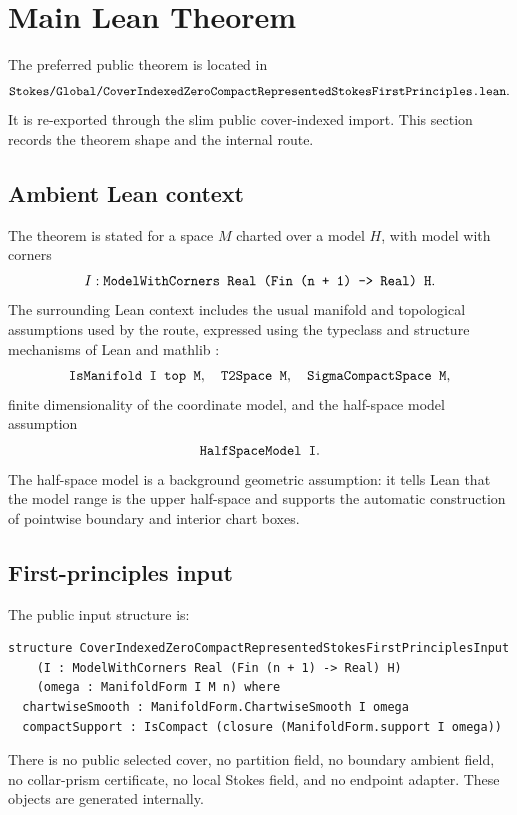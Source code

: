 \section{Main Lean Theorem}
\label{sec:main-theorem}

The preferred public theorem is located in
\[
\code{Stokes/Global/CoverIndexedZeroCompactRepresentedStokesFirstPrinciples.lean}.
\]
It is re-exported through the slim public cover-indexed import.  This section
records the theorem shape and the internal route.

\subsection{Ambient Lean context}

The theorem is stated for a space \(M\) charted over a model \(H\), with model
with corners
\[
  I : \code{ModelWithCorners Real (Fin (n + 1) -> Real) H}.
\]
The surrounding Lean context includes the usual manifold and topological
assumptions used by the route, expressed using the typeclass and structure
mechanisms of Lean and mathlib
\cite{demoura2015lean,demoura2021lean4,baanen2022instance,mathlib2020}:
\[
\code{IsManifold I top M},\quad
\code{T2Space M},\quad
\code{SigmaCompactSpace M},
\]
finite dimensionality of the coordinate model, and the half-space model
assumption
\[
\code{HalfSpaceModel I}.
\]
The half-space model is a background geometric assumption: it tells Lean that
the model range is the upper half-space and supports the automatic construction
of pointwise boundary and interior chart boxes.

\subsection{First-principles input}

The public input structure is:
\begin{lstlisting}[language=Lean]
structure CoverIndexedZeroCompactRepresentedStokesFirstPrinciplesInput
    (I : ModelWithCorners Real (Fin (n + 1) -> Real) H)
    (omega : ManifoldForm I M n) where
  chartwiseSmooth : ManifoldForm.ChartwiseSmooth I omega
  compactSupport : IsCompact (closure (ManifoldForm.support I omega))
\end{lstlisting}
There is no public selected cover, no partition field, no boundary ambient
field, no collar-prism certificate, no local Stokes field, and no endpoint
adapter.  These objects are generated internally.

